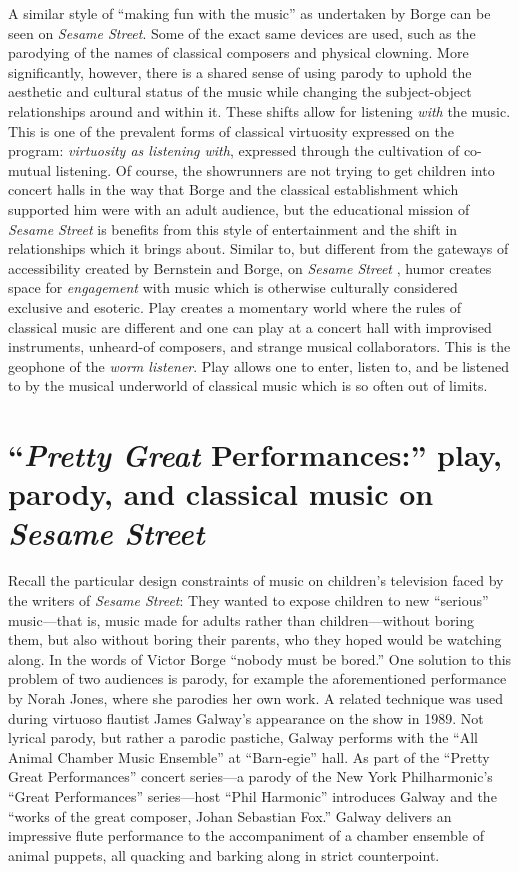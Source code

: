 \documentclass[12pt,letterpaper]{article}
\newcommand{\ses}{\textit{Sesame Street }}
\begin{document}
	A similar style of ``making fun with the music'' as undertaken by 
	Borge can be seen on \textit{Sesame Street}. Some of the exact same 
	devices are used, such as the parodying of the names of classical 
	composers and physical clowning. More significantly, however, there is 
	a shared sense of using
	parody to uphold the aesthetic and cultural status of the music while
	changing the subject-object relationships around and within it. 
	These shifts allow for listening \textit{with} the music. This is one
	of the prevalent forms
	of classical virtuosity expressed on the program: \textit{virtuosity as 
	listening with}, expressed through the cultivation of co-mutual
	listening. Of course, the showrunners are not trying to
	get children into concert halls in the way that Borge and the
	classical establishment which supported him were with an adult 
	audience, but the educational mission of \ses
	is benefits from this style of entertainment and the shift in 
	relationships which it brings about. Similar to, but different from the
	gateways of
	accessibility created by Bernstein and Borge, on \ses, humor creates 
	space for \textit{engagement} with music which is otherwise culturally
	considered exclusive and esoteric. Play creates a momentary world 
	where the rules of classical music are different and one can play 
	at a concert hall with improvised instruments, unheard-of composers,
	and strange musical collaborators. This is the geophone of the
	\textit{worm listener}. Play allows one to enter, listen to, and be 
	listened to by the musical underworld of classical music which is so 
	often out of limits.

	\section*{``\textit{Pretty Great} Performances:'' play, parody, and 
	classical music on \ses}
	
	Recall the particular design constraints of music on children's
	television faced by the writers of \textit{Sesame Street}: 	
	They wanted to expose children to new ``serious'' music---that is, music
	made for adults rather than children---without boring
	them, but also without boring their parents, who they hoped would be 
	watching along. In the words of Victor Borge ``nobody must
	be bored.'' One solution to this problem of two audiences is parody,
	for example the aforementioned performance by Norah Jones, where she
	parodies her own work. A related technique was used during virtuoso 
	flautist James Galway's appearance on the show in 1989. Not lyrical 
	parody, but rather a parodic pastiche, Galway performs with the ``All 
	Animal Chamber Music Ensemble'' at ``Barn-egie'' hall. As part of the 
	``Pretty Great Performances'' concert series---a parody of the New York
	Philharmonic's ``Great Performances'' series---host ``Phil Harmonic'' 
	introduces Galway and the ``works of the great composer, Johan Sebastian
	Fox.'' Galway delivers an impressive flute 
	performance to the accompaniment of a chamber ensemble of animal 
	puppets, all quacking and barking along in strict 
	counterpoint.\autocite{Galway2}
\end{document}
